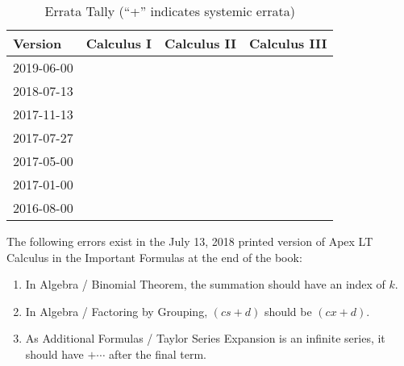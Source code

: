 \documentclass{amsart}
\makeatletter
\newcommand{\errorcount}[1]{%
 \@ifundefined{r@#1plus}{%
  \@ifundefined{r@#1}{%
  }{%
   \makebox[2em][r]{\ref{#1}\phantom{+}}
  }
 }{%
  \makebox[2em][r]{\ref{#1plus}{+}}
 }
}
\newcommand{\errorrow}[1]{%
 #1 & \errorcount{#1I} & \errorcount{#1II} & \errorcount{#1III}
}
\makeatother
\begin{document}
\begin{table}[h]
\caption{Errata Tally (``+'' indicates systemic errata)}
\begin{tabular}{lccc}\toprule
Version & Calculus I & Calculus II & Calculus III \\\midrule
\errorrow{2019-06-00} \\
\errorrow{2018-07-13} \\
\errorrow{2017-11-13} \\
\errorrow{2017-07-27} \\
\errorrow{2017-05-00} \\
\errorrow{2017-01-00} \\
\errorrow{2016-08-00} \\
\bottomrule
\end{tabular}
\end{table}


\noindent
The following errors exist in the July 13, 2018 printed version of Apex LT Calculus in the Important Formulas at the end of the book:
\begin{enumerate}
\item In Algebra / Binomial Theorem, the summation should have an index of $k$.
\item In Algebra / Factoring by Grouping, $(cs+d)$ should be $(cx+d)$.
\item As Additional Formulas / Taylor Series Expansion is an infinite series, it should have $+\dotsb$ after the final term.
\label{2018-07-13}
\end{enumerate}\bigskip
\end{document}
